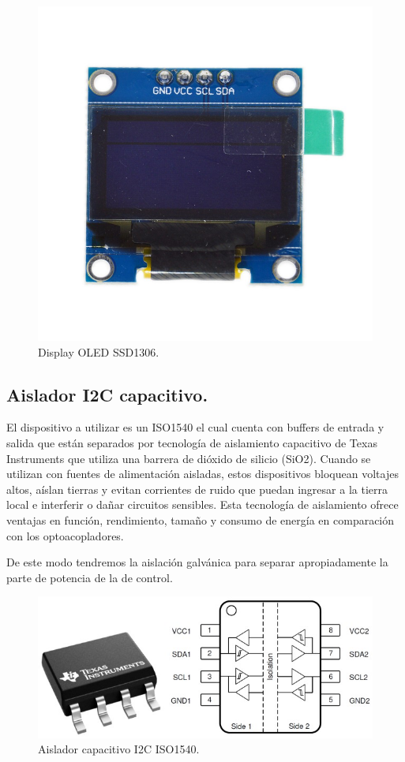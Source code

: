 \begin{figure}[H]
    \centering 
    \includegraphics[scale=0.3]{./imagenes/display.jpg}
    \caption{Display OLED SSD1306.}
    \label{F:display}
\end{figure}

\subsection{Aislador I2C capacitivo.}
El dispositivo a utilizar es un ISO1540 \cite{ISO1540} el cual cuenta con buffers de entrada y salida que están separados por tecnología de aislamiento capacitivo de Texas Instruments que utiliza una barrera de dióxido de silicio (SiO2). Cuando se utilizan con fuentes de alimentación aisladas, estos dispositivos bloquean voltajes altos, aíslan tierras y evitan corrientes de ruido que puedan ingresar a la tierra local e interferir o dañar circuitos sensibles. Esta tecnología de aislamiento ofrece ventajas en función, rendimiento, tamaño y consumo de energía en comparación con los optoacopladores. \par 
De este modo tendremos la aislación galvánica para separar apropiadamente la parte de potencia de la de control.
\begin{figure}[H]
    \centering
    \includegraphics[scale=0.5]{./imagenes/optoi2c.jpg}
    \caption{Aislador capacitivo I2C ISO1540.}
    \label{F:optoi2c}
\end{figure}

